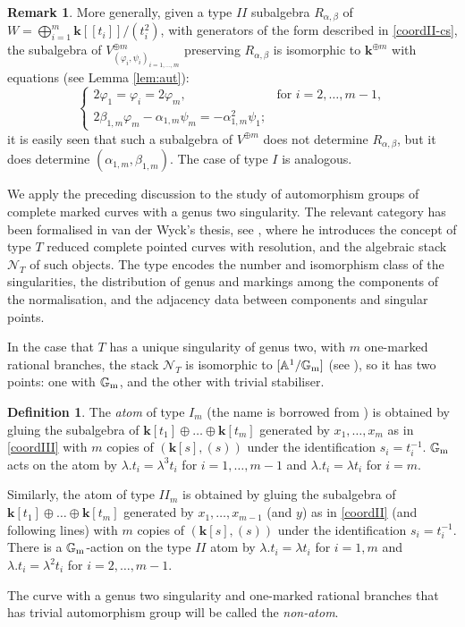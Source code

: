 \documentclass[11pt]{amsart}
\renewcommand{\k}{\mathbf k}
\newcommand{\Aaff}{\mathbb A}
\newcommand{\Gm}{\mathbb{G}_{\rm{m}}}
\theoremstyle{plain}
\theoremstyle{definition}
\newtheorem{dfn}[thm]{Definition}
\newtheorem{rem}[thm]{Remark}
\begin{document}
\begin{rem}
 More generally, given a type $I\!I$ subalgebra $R_{\alpha,\beta}$ of $W=\bigoplus_{i=1}^m\k[\![t_i]\!]/(t_i^2)$, with generators of the form described in \eqref{coordII-cs}, the subalgebra of $V^{\oplus m}_{(\varphi_i,\psi_i)_{i=1,\ldots,m}}$ preserving $R_{\alpha,\beta}$ is isomorphic to $\k^{\oplus m}$ with equations (see Lemma \ref{lem:aut}):
 \[\begin{cases} 2\varphi_1=\varphi_i=2\varphi_m, & \text{for } i=2,\ldots,m-1,\\ 2\beta_{1,m}\varphi_m-\alpha_{1,m}\psi_m=-\alpha_{1,m}^2\psi_1;\end{cases}\]
 it is easily seen that such a subalgebra of $V^{\oplus m}$ does not determine $R_{\alpha,\beta}$, but it does determine $(\alpha_{1,m},\beta_{1,m})$. The case of type $I$ is analogous.
\end{rem}

We apply the preceding discussion to the study of automorphism groups of complete marked curves with a genus two singularity. The relevant category has been formalised in van der Wyck's thesis, see \cite[Proposition 1.102, Theorem 1.105 and Corollary 1.106]{vdW}, where he introduces the concept of type $T$ reduced complete pointed curves with resolution, and the algebraic stack $\mathcal N_T$ of such objects. The type encodes the number and isomorphism class of the singularities, the distribution of genus and markings among the components of the normalisation, and the adjacency data between components and singular points. 

In the case that $T$ has a unique singularity of genus two, with $m$ one-marked rational branches, the stack $\mathcal N_T$ is isomorphic to $[\Aaff^1/\Gm]$ (see \cite[Examples 1.111-112]{vdW}), so it has two points: one with $\Gm$, and the other with trivial stabiliser.

\begin{dfn}
 The \emph{atom} of type $I_m$ (the name is borrowed from \cite{AFS1}) is obtained by gluing the subalgebra of $\k[t_1]\oplus\ldots\oplus\k[t_m]$ generated by $x_1,\ldots,x_m$ as in \eqref{coordIII} with $m$ copies of $(\k[s],(s))$ under the identification $s_i=t_i^{-1}$. $\Gm$ acts on the  atom by $\lambda.t_i=\lambda^3 t_i$ for $i=1,\ldots,m-1$ and $\lambda.t_i=\lambda t_i$ for $i=m$.
 
 Similarly, the atom of type $I\!I_m$ is obtained by gluing the subalgebra of $\k[t_1]\oplus\ldots\oplus\k[t_m]$ generated by $x_1,\ldots,x_{m-1}$ (and $y$) as in \eqref{coordII} (and following lines) with $m$ copies of $(\k[s],(s))$ under the identification $s_i=t_i^{-1}$. There is a $\Gm$-action on the type $I\!I$ atom by $\lambda.t_i=\lambda t_i$ for $i=1,m$ and $\lambda.t_i=\lambda^2 t_i$ for $i=2,\ldots,m-1$.
 
 The curve with a genus two singularity and one-marked rational branches that has trivial automorphism group will be called the \emph{non-atom}.
\end{dfn}
\end{document}
